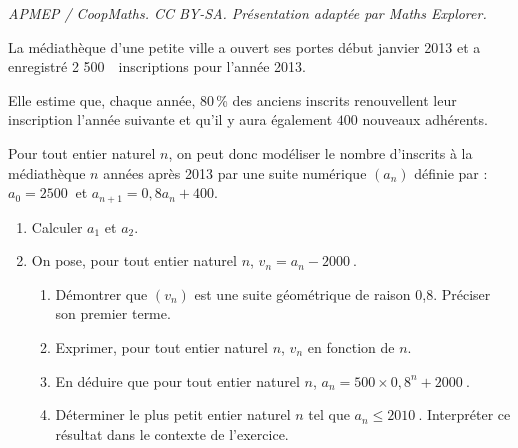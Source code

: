 \documentclass[10pt]{article}
\providecommand{\np}[2][]{{#2~#1}}
\begin{document}
\noindent\textit{APMEP / CoopMaths. CC BY-SA. Présentation adaptée par Maths Explorer.}\par\medskip
\medskip

La médiathèque d'une petite ville a ouvert ses portes début janvier 2013 et a enregistré \np{2 500}~inscriptions pour l'année 2013.

Elle estime que, chaque année, 80\,\% des anciens inscrits renouvellent leur inscription l'année suivante et qu'il y aura également $400$ nouveaux adhérents.

Pour tout entier naturel $n$, on peut donc modéliser le nombre d'inscrits à la médiathèque $n$ années après 2013 par une suite numérique $(a_n)$ définie par :
$ a_0=\np{2500}$ et $a_{n+1}=0,8a_n + 400$.

\medskip

\begin{enumerate}
\item  Calculer $a_1$ et $a_2$.
\item On pose, pour tout entier naturel $n$, $v_n=a_n- \np{2000}$.
	\begin{enumerate}
		\item Démontrer que $\left(v_n\right)$ est une suite géométrique de raison 0,8. Préciser son premier terme.
		\item Exprimer, pour tout entier naturel $n$, $v_n$ en fonction de $n$.
		\item En déduire que pour tout entier naturel $n$, $a_n=500\times 0,8^n + \np{2000}$.
		\item Déterminer le plus petit entier naturel $n$ tel que $a_n\leqslant \np{2010}$. Interpréter ce résultat dans le contexte de l'exercice. 
	\end{enumerate}
\end{enumerate}
\end{document}
